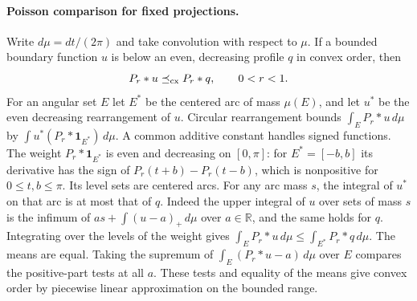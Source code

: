 \documentclass[11pt]{article}
\begin{document}
	\paragraph{Poisson comparison for fixed projections.}
	Write $d\mu=dt/(2\pi)$ and take convolution with respect to $\mu$.
	If a bounded boundary function $u$ is below an even, decreasing
	profile $q$ in convex order, then
	\begin{equation}\label{eq:poisson-convex-order}
		P_r*u\preceq_{\rm cx}P_r*q,\qquad 0<r<1 .
	\end{equation}
	For an angular set $E$ let $E^*$ be the centered arc of mass $\mu(E)$,
	and let $u^*$ be the even decreasing rearrangement of $u$.
	Circular rearrangement \cite{Circle} bounds $\int_E P_r*u\,d\mu$ by
	$\int u^*(P_r*\mathbf 1_{E^*})\,d\mu$. A common additive constant
	handles signed functions. The weight $P_r*\mathbf 1_{E^*}$ is even
	and decreasing on $[0,\pi]$: for $E^*=[-b,b]$ its derivative has
	the sign of $P_r(t+b)-P_r(t-b)$, which is nonpositive for
	$0\leq t,b\leq\pi$. Its level sets are centered arcs.
	For any arc mass $s$, the integral of $u^*$ on that arc is at
	most that of $q$. Indeed the upper integral of $u$ over sets of
	mass $s$ is the infimum of $as+\int(u-a)_+\,d\mu$ over
	$a\in\mathbb R$, and the same holds for $q$. Integrating over
	the levels of the weight gives
	$\int_E P_r*u\,d\mu\leq\int_{E^*}P_r*q\,d\mu$.
	The means are equal. Taking the supremum of
	$\int_E(P_r*u-a)\,d\mu$ over $E$ compares the positive-part
	tests at all $a$. These tests and equality of the means give
	convex order by piecewise linear approximation on the bounded range.
	
\end{document}
